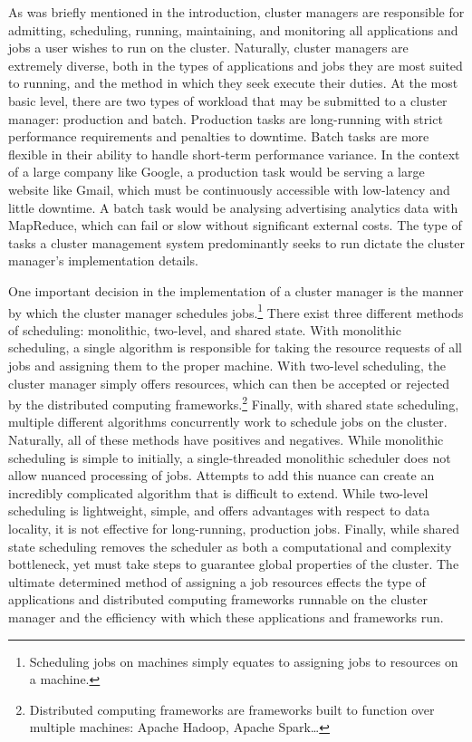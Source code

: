 As was briefly mentioned in the introduction, cluster managers are responsible
for admitting, scheduling, running, maintaining, and monitoring all applications
and jobs a user wishes to run on the cluster. Naturally, cluster managers are
extremely diverse, both in the types of applications and jobs they are most
suited to running, and the method in which they seek execute their duties.
At the most basic level, there are two types of workload that may be submitted
to a cluster manager: production and batch. Production tasks are long-running
with strict performance requirements and penalties to downtime. Batch tasks are
more flexible in their ability to handle short-term performance variance. In the
context of a large company like Google, a production task would be serving a
large website like Gmail, which must be continuously accessible with low-latency
and little downtime. A batch task would be analysing advertising analytics data
with MapReduce, which can fail or slow without significant external
costs.\cite[pg. 1]{borg} The type of tasks a cluster management system
predominantly seeks to run dictate the cluster manager's implementation details.

One important decision in the implementation of a cluster manager is the manner
by which the cluster manager schedules jobs.\footnote{Scheduling jobs on
machines simply equates to assigning jobs to resources on a machine.}  There exist three
different methods of scheduling: monolithic, two-level, and
shared state. With monolithic scheduling, a single algorithm
is responsible for taking the resource requests of all jobs and assigning them
to the proper machine. With two-level scheduling, the cluster manager simply
offers resources, which can then be accepted or rejected by the distributed
computing frameworks.\footnote{Distributed computing frameworks are frameworks
built to function over multiple machines: Apache Hadoop, Apache Spark\dots}
Finally, with shared state scheduling, multiple different algorithms concurrently work to
schedule jobs on the cluster.\cite[pg. 1]{omega} Naturally, all
of these methods have positives and negatives. While monolithic scheduling is
simple to initially, a single-threaded monolithic scheduler does not allow
nuanced processing of jobs. Attempts to add this nuance can create an incredibly
complicated algorithm that is difficult to extend.\cite[pg. 353-354]{omega}
While two-level scheduling is lightweight, simple, and offers advantages with respect to
data locality, it is not effective for long-running,
production jobs. Finally, while shared state scheduling removes the scheduler as
both a computational and complexity bottleneck, yet must take steps to guarantee
global properties of the cluster.\cite[pg. 363]{omega}
The ultimate determined method of assigning a job
resources effects the type of applications and distributed computing frameworks
runnable on the cluster manager and the efficiency with which these applications
and frameworks run.

